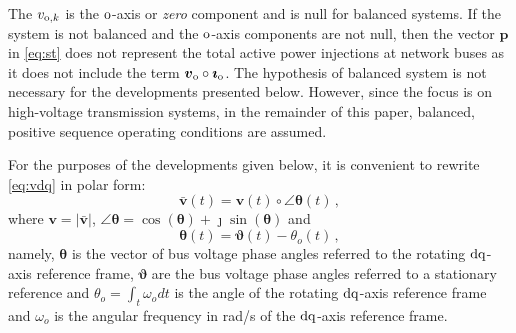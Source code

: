 \documentclass[journal, twocolumn, letter]{IEEEtran}
\newcommand{\bfg}[1]{\boldsymbol{#1}}
\newcommand{\bfp}[1]{\bar{\boldsymbol{#1}}}
\renewcommand{\to}{\theta_o}
\newcommand{\wo}{\omega_o}
\newcommand{\jj}{\jmath}
\newcommand{\vvec}{\bfp v}
\newcommand{\tvec}{\bfg \theta}
\begin{document}
The $v_{{\rm o}, k}$ is the $\rm o$-axis or \textit{zero} component
and is null for balanced systems.  If the system is not balanced and
the $\rm o$-axis components are not null, then the vector $\bfg p$ in
\eqref{eq:st} does not represent the total active power injections at
network buses as it does not include the term
$\bfg v_{\rm o} \circ \bfg \imath_{\rm o}$.  The hypothesis of
balanced system is not necessary for the developments presented below.
However, since the focus is on high-voltage transmission systems, in
the remainder of this paper, balanced, positive sequence operating
conditions are assumed.







For the purposes of the developments given below, it is convenient to
rewrite \eqref{eq:vdq} in polar form:
\begin{equation}
  \label{eq:vpolar}
  \vvec(t) = \bfg v(t) \circ \angle \tvec(t) \, ,
\end{equation}
where $\bfg v = |\vvec|$,
$\angle \tvec = \cos(\tvec) + \jj \sin(\tvec)$ and
\begin{equation}
  \label{eq:theta}
  \tvec(t) = \bfg \vartheta(t) - \to(t) \, ,
\end{equation}
namely, $\tvec$ is the vector of bus voltage phase angles referred to
the rotating $\rm dq$-axis reference frame, $\bfg \vartheta$ are the
bus voltage phase angles referred to a  stationary
 reference and $\to = \int_t \wo dt$ is the angle of the
rotating $\rm dq$-axis reference frame and $\wo$ is the angular
frequency in rad/s of the $\rm dq$-axis reference frame.
\end{document}
